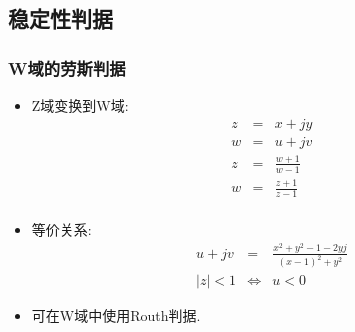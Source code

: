 \documentclass[table]{beamer}
\begin{document}
\subsection{稳定性判据}
\label{sec-5-2}

\begin{frame}
\frametitle{W域的劳斯判据}
\label{sec-5-2-1}

\begin{itemize}
\item Z域变换到W域:
       \begin{eqnarray*}
       	z & = & x+jy\\
       	w &= & u+jv \\
       	z & = &\frac{w+1}{w-1} \\
       	w &= & \frac{z+1}{z-1} \\
       \end{eqnarray*}
\item <2->等价关系:
       \begin{eqnarray*}
       u+jv &=& \frac{x^2+y^2-1-2yj}{(x-1)^2+y^2} \\
       |z|<1 &\Leftrightarrow& u<0 
       \end{eqnarray*}
\item <3->可在W域中使用Routh判据.
\end{itemize}
\end{frame}
\end{document}
